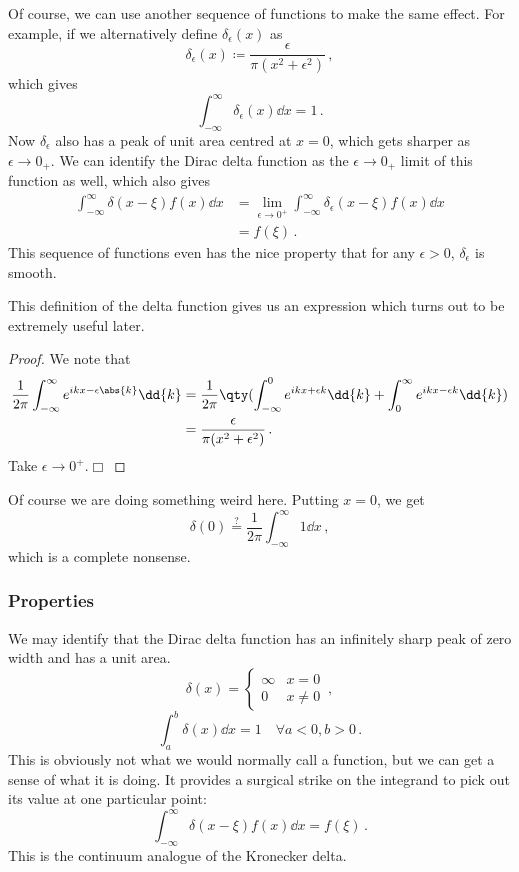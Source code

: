 \documentclass{article}
\theoremstyle{plain}\theoremheaderfont{\normalfont\itshape}\theorembodyfont{\rmfamily}\theoremseparator{.}\newtheorem*{rem}{Remark}\newtheorem*{ex}{Example}\newtheorem*{proof}{Proof}\newtheorem*{altp}{Alternative proof}
\theoremstyle{plain}\theoremheaderfont{\normalfont\bfseries}\theorembodyfont{\rmfamily}\theoremseparator{.}\newtheorem{thm}{Theorem}[section]\newtheorem{lem}[thm]{Lemma}\newtheorem{prop}[thm]{Proposition}\newtheorem*{cor}{Corollary}\newtheorem{defn}[thm]{Definition}\newtheorem{clm}[thm]{Claim}\newtheorem{clminproof}{Claim}
\theoremstyle{break}\theoremheaderfont{\normalfont\itshape}\theorembodyfont{\rmfamily}\theoremseparator{.\medskip}\newtheorem*{proofskip}{Proof}\newtheorem*{exs}{Examples}\newtheorem*{rems}{Remarks}
\theoremstyle{break}\theoremheaderfont{\normalfont\bfseries}\theorembodyfont{\rmfamily}\theoremseparator{.\medskip}\newtheorem{lemskip}[thm]{Lemma}\newtheorem{defnskip}[thm]{Definition}\newtheorem{propskip}[thm]{Proposition}\newtheorem{thmskip}[thm]{Theorem}
\numberwithin{equation}{section}
\newcommand{\qed}{\hfill\ensuremath{\Box}}
\begin{document}
	Of course, we can use another sequence of functions to make the same effect. For example, if we alternatively define \(\delta_\epsilon(x)\) as
	\[\delta_\epsilon(x)\coloneqq\frac{\epsilon}{\pi(x^2+\epsilon^2)}\,,\]
	which gives
	\[\int_{-\infty}^{\infty}\delta_\epsilon(x)\dd{x}=1\,.\]
	Now \(\delta_\epsilon\) also has a peak of unit area centred at \(x=0\), which gets sharper as \(\epsilon\to 0_+\). We can identify the Dirac delta function as the \(\epsilon\to 0_+\) limit of this function as well, which also gives
	\begin{align*}
		\int_{-\infty}^{\infty}\delta(x-\xi)f(x)\dd{x}&=\lim_{\epsilon\to 0^+}\int_{-\infty}^{\infty}\delta_\epsilon(x-\xi)f(x)\dd{x}\\
		&=f(\xi)\,.
	\end{align*}
	This sequence of functions even has the nice property that for any \(\epsilon>0\), \(\delta_\epsilon\) is smooth.
	
	This definition of the delta function gives us an expression which turns out to be extremely useful later.
	\begin{prop}\label[prop]{Fourier_one}
		\[\delta(x)=\frac{1}{2\pi}\int_{-\infty}^{\infty}e^{ikx}\dd{k}\,.\]
	\end{prop}
	\begin{proof}
		We note that
		\begin{align*}
			\frac{1}{2\pi}\int_{-\infty}^{\infty}e^{ikx-\epsilon\abs{k}}\dd{k}&=\frac{1}{2\pi}\qty(\int_{-\infty}^{0}e^{ikx+\epsilon k}\dd{k}+\int_{0}^{\infty}e^{ikx-\epsilon k}\dd{k})\\
			&=\frac{\epsilon}{\pi(x^2+\epsilon^2)}\,.
		\end{align*}
		Take \(\epsilon\to 0^+\).\qed
	\end{proof}
	Of course we are doing something weird here. Putting \(x=0\), we get
	\[\delta(0)\stackrel{?}{=}\frac{1}{2\pi}\int_{-\infty}^{\infty}1\dd{x}\,,\]
	which is a complete nonsense. 
	
	\subsubsection{Properties}
	We may identify that the Dirac delta function has an infinitely sharp peak of zero width and has a unit area.
	\[\delta(x)=\begin{cases}
		\infty & x=0\\
		0 & x\ne 0
	\end{cases}\,,\]
	\[\int_{a}^{b}\delta(x)\dd{x}=1 \quad \forall a<0, b>0\,.\]
	This is obviously not what we would normally call a function, but we can get a sense of what it is doing. It provides a surgical strike on the integrand to pick out its value at one particular point:
	\[\int_{-\infty}^{\infty}\delta(x-\xi)f(x)\dd{x}=f(\xi)\,.\]
	This is the continuum analogue of the Kronecker delta.
	
\end{document}
